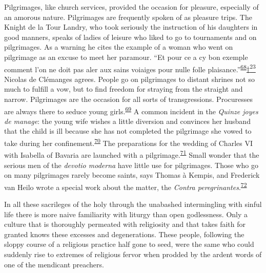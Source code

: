 Pilgrimages, like church services, provided the occasion for pleasure,
especially of an amorous nature. Pilgrimages are frequently spoken of as
pleasure trips. The Knight de la Tour Landry, who took seriously the
instruction of his daughters in good manners, speaks of ladies of
leisure who liked to go to tournaments and on pilgrimages. As a warning
he cites the example of a woman who went on pilgrimage as an excuse to
meet her paramour. ``Et pour ce a cy bon exemple comment l'on ne doit
pas aler aux sains voiaiges pour nulle folle
plaisance.''\textsuperscript{\protect\hypertarget{13_Chapter_Six__THE_DEPICTION_OF_TH.xhtmlux5cux23id_1135}{\protect\hyperlink{23_NOTES.xhtmlux5cux23id_1136}{68}}}\protect\hypertarget{13_Chapter_Six__THE_DEPICTION_OF_TH.xhtmlux5cux23id_3033}{\protect\hyperlink{23_NOTES.xhtmlux5cux23id_3034}{†\textsuperscript{23}}}
Nicolas de Clémanges agrees. People go on pilgrimages to distant shrines
not so much to fulfill a vow, but to find freedom for straying from the
straight and narrow. Pilgrimages are the occasion for all sorts of
transgressions. Procuresses are always there to seduce young
girls.\textsuperscript{\protect\hypertarget{13_Chapter_Six__THE_DEPICTION_OF_TH.xhtmlux5cux23id_1133}{\protect\hyperlink{23_NOTES.xhtmlux5cux23id_1134}{69}}}
A common incident in the \emph{Quinze joyes de manage}: the young wife
wishes a little diversion and convinces her husband that the child is
ill because she has not completed the pilgrimage she vowed to take
during her
confinement.\textsuperscript{\protect\hypertarget{13_Chapter_Six__THE_DEPICTION_OF_TH.xhtmlux5cux23id_1131}{\protect\hyperlink{23_NOTES.xhtmlux5cux23id_1132}{70}}}
The preparations for the wedding of Charles VI with Isabella of Bavaria
are launched with a
pilgrimage.\textsuperscript{\protect\hypertarget{13_Chapter_Six__THE_DEPICTION_OF_TH.xhtmlux5cux23id_1129}{\protect\hyperlink{23_NOTES.xhtmlux5cux23id_1130}{71}}}
Small wonder that the serious men of the \emph{devotio moderna} have
little use
\protect\hypertarget{13_Chapter_Six__THE_DEPICTION_OF_TH.xhtmlux5cux23page_186}{}{}for
pilgrimages. Those who go on many pilgrimages rarely become saints, says
Thomas à Kempis, and Frederick van Heilo wrote a special work about the
matter, the \emph{Contra
peregrinantes}.\textsuperscript{\protect\hypertarget{13_Chapter_Six__THE_DEPICTION_OF_TH.xhtmlux5cux23id_1127}{\protect\hyperlink{23_NOTES.xhtmlux5cux23id_1128}{72}}}

In all these sacrileges of the holy through the unabashed intermingling
with sinful life there is more naive familiarity with liturgy than open
godlessness. Only a culture that is thoroughly permeated with
religiosity and that takes faith for granted knows these excesses and
degenerations. These people, following the sloppy course of a religious
practice half gone to seed, were the same who could suddenly rise to
extremes of religious fervor when prodded by the ardent words of one of
the mendicant preachers.

